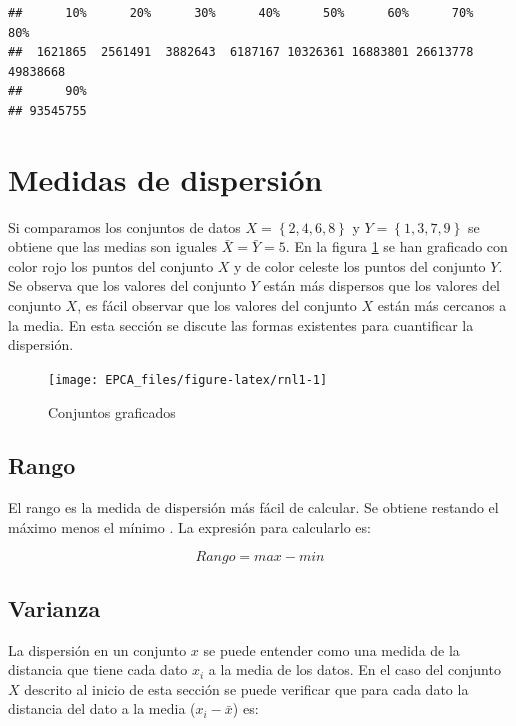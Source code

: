 \documentclass[
]{krantz}
\begin{document}
\begin{verbatim}
##      10%      20%      30%      40%      50%      60%      70%      80% 
##  1621865  2561491  3882643  6187167 10326361 16883801 26613778 49838668 
##      90% 
## 93545755
\end{verbatim}

\hypertarget{dispersion}{%
\section{Medidas de dispersión}\label{dispersion}}

Si comparamos los conjuntos de datos \(X=\left\{ 2,4,6,8 \right\}\) y \(Y=\left\{1,3,7,9\right\}\) se obtiene que las medias son iguales \(\bar{X}= \bar{Y}=5\). En la figura \ref{fig:rnl1} se han graficado con color rojo los puntos del conjunto \(X\) y de color celeste los puntos del conjunto \(Y\). Se observa que los valores del conjunto \(Y\) están más dispersos que los valores del conjunto \(X\), es fácil observar que los valores del conjunto \(X\) están más cercanos a la media. En esta sección se discute las formas existentes para cuantificar la dispersión.

\begin{figure}[h!]

{\centering \texttt{[image: EPCA\_files/figure-latex/rnl1-1]} 

}

\caption{Conjuntos graficados}\label{fig:rnl1}
\end{figure}

\hypertarget{rango}{%
\subsection{Rango}\label{rango}}

El rango es la medida de dispersión más fácil de calcular. Se obtiene restando el máximo menos el mínimo \citep{groebner2018}. La expresión para calcularlo es:

\begin{equation} 
  Rango = max - min
  \label{eq:rg}
\end{equation}

\hypertarget{varianza}{%
\subsection{Varianza}\label{varianza}}

La dispersión en un conjunto \(x\) se puede entender como una medida de la distancia que tiene cada dato \(x_i\) a la media de los datos. En el caso del conjunto \(X\) descrito al inicio de esta sección se puede verificar que para cada dato la distancia del dato a la media (\(x_i-\bar{x}\)) es:
\end{document}
